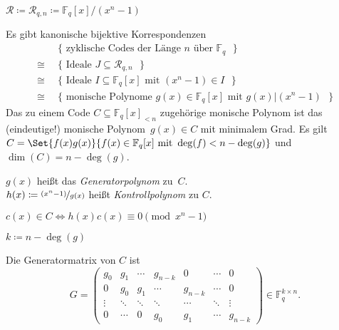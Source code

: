 \documentclass{cheat-sheet}
\newcommand{\F}{\mathbb{F}} %
\newcommand{\divides}{|} %
\begin{document}

\begin{nota}
  $\mathcal{R} \coloneqq \mathcal{R}_{q,n} \coloneqq \F_q[x] / (x^n - 1)$
\end{nota}

\begin{satz}
  Es gibt kanonische bijektive Korrespondenzen
  \begin{align*}
    & \{ \text{ zyklische Codes der Länge $n$ über $\F_q$ } \} \\
    \cong \enspace & \{ \text{ Ideale $J \subseteq \mathcal{R}_{q,n}$ } \} \\
    \cong \enspace & \{ \text{ Ideale $I \subseteq \F_q[x]$ mit $(x^n - 1) \in I$ } \} \\
    \cong \enspace & \{ \text{ monische Polynome $g(x) \in \F_q[x]$ mit $g(x) \divides (x^n - 1)$ } \}
  \end{align*}
  Das zu einem Code $C \subseteq \F_q[x]_{< n}$ zugehörige monische Polynom ist das (eindeutige!) monische Polynom~$g(x) \in C$ mit minimalem Grad.
  Es gilt $C = \Set{f(x) g(x)}{f(x) \in \F_q[x] \text{ mit } \deg(f) < n - \deg(g)}$ und $\dim(C) = n - \deg(g)$.
\end{satz}

\begin{defn}
  \begin{minipage}[t]{0.8 \linewidth}
    $g(x)$ heißt das \emph{Generatorpolynom} zu~$C$. \\
    $h(x) \coloneqq \nicefrac{(x^n - 1)}{g(x)}$ heißt \emph{Kontrollpolynom} zu $C$.
  \end{minipage}
\end{defn}

\begin{lem}
  $c(x) \in C \iff h(x) c(x) \equiv 0 \pmod{x^n - 1}$
\end{lem}

\begin{nota}
  $k \coloneqq n - \deg(g)$
\end{nota}

\begin{bem}
  Die Generatormatrix von $C$ ist
  \[
    G = \begin{pmatrix}
      g_0 & g_1 & \cdots & g_{n-k} & 0 & \cdots & 0 \\
      0 & g_0 & g_1 & \cdots & g_{n-k} & \cdots & 0 \\
      \vdots & \ddots & \ddots & \ddots & \cdots & \ddots & \vdots \\
      0 & \cdots & 0 & g_0 & g_1 & \cdots & g_{n-k}
    \end{pmatrix} \in \F_q^{k \times n}.
  \]
\end{bem}
\end{document}
